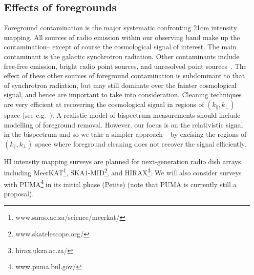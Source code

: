 \subsection{Effects of foregrounds}
%
Foreground contamination is the major systematic confronting 21cm intensity mapping. All sources of radio emission within our observing band make up the contamination-- except of course the cosmological signal of interest. The main contaminant is the galactic synchrotron radiation. Other contaminants include free-free emission, bright radio point sources, and unresolved point sources~\cite{Liu:2019awk}. The effect of these other sources of foreground contamination is subdominant to that of synchrotron radiation, but may still dominate over the fainter cosmological signal, and hence are important to take into consideration. 
Cleaning techniques are very efficient at recovering the cosmological signal in regions of $(k_\|,k_\perp)$ space (see e.g.~\cite{Pober:2013jna, Bull:2014rha, Alonso:2014dhk, Pober:2014lva, Wolz:2015sqa, Santos:2015gra, Shaw:2014khi, Obuljen:2017jiy, Ansari:2018ury, Witzemann:2018cdx, Bacon:2018dui, Asorey:2020mxs, Cunnington:2020mnn}). A realistic model of bispectrum measurements should include modelling of foreground removal. However, our focus is on the relativistic signal in the bispectrum and so we take a simpler approach -- by excising the regions of $(k_\|,k_\perp)$ space where foreground cleaning does not recover the signal efficiently.

HI intensity mapping surveys are planned for next-generation radio dish arrays, including MeerKAT\footnote{www.sarao.ac.za/science/meerkat/}, SKA1-MID\footnote{{www.skatelescope.org/}}, and HIRAX\footnote{hirax.ukzn.ac.za/}. We will also consider surveys with
PUMA\footnote{{www.puma.bnl.gov/}} in its initial phase (Petite) (note that PUMA is currently still a proposal).

